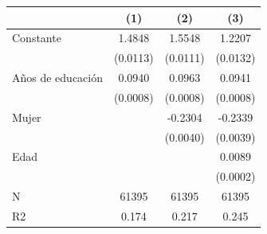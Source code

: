 \begin{table}
\centering
\begin{tabular}[t]{lccc}
\toprule
  & (1) & (2) & (3)\\
\midrule
Constante & 1.4848 & 1.5548 & 1.2207\\
 & (0.0113) & (0.0111) & (0.0132)\\
Años de educación & 0.0940 & 0.0963 & 0.0941\\
 & (0.0008) & (0.0008) & (0.0008)\\
Mujer &  & -0.2304 & -0.2339\\
 &  & (0.0040) & (0.0039)\\
Edad &  &  & 0.0089\\
 &  &  & (0.0002)\\
\midrule
N & 61395 & 61395 & 61395\\
R2 & 0.174 & 0.217 & 0.245\\
\bottomrule
\end{tabular}
\end{table}
